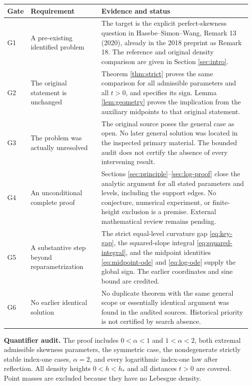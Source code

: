 \documentclass[11pt,a4paper]{article}
\theoremstyle{definition}
\theoremstyle{remark}
\numberwithin{equation}{section}
\newcommand{\hp}{h_\ast}
\begin{document}
\begingroup
\small
\renewcommand{\arraystretch}{1.15}
\begin{longtable}{@{}p{}>{\raggedright\arraybackslash}p{}>{\raggedright\arraybackslash}p{}@{}}
\toprule
Gate & Requirement & Evidence and status\\
\midrule
\endhead
G1 & A pre-existing identified problem &
The target is the explicit perfect-skewness question in
Hasebe--Simon--Wang, Remark 13 (2020), already in the 2018 preprint
as Remark 18. The reference and original density comparison are
given in Section \ref{sec:intro}.\\
G2 & The original statement is unchanged &
Theorem \ref{thm:strict} proves the same comparison for all admissible
parameters and all $t>0$, and specifies its sign. Lemma
\ref{lem:geometry} proves the implication from the auxiliary
midpoints to that original statement.\\
G3 & The problem was actually unresolved &
The original source poses the general case as open. No later general
solution was located in the inspected primary material. The bounded
audit does not certify the absence of every intervening result.\\
G4 & An unconditional complete proof &
Sections \ref{sec:principle}--\ref{sec:log-proof} close the analytic
argument for all stated parameters and levels, including the support
edges. No conjecture, numerical experiment, or finite-height
exclusion is a premise. External mathematical review remains pending.\\
G5 & A substantive step beyond reparametrization &
The strict equal-level curvature gap \eqref{eq:key-gap}, the
squared-slope integral \eqref{eq:squared-integral}, and the midpoint
identities \eqref{eq:midpoint-ode} and \eqref{eq:log-ode} supply the
global sign. The earlier coordinates and sine bound are credited.\\
G6 & No earlier identical solution &
No duplicate theorem with the same general scope or essentially
identical argument was found in the audited sources. Historical
priority is not certified by search absence.\\
\bottomrule
\end{longtable}
\endgroup

\noindent\textbf{Quantifier audit.}
The proof includes $0<\alpha<1$ and $1<\alpha<2$, both extremal
admissible skewness parameters, the symmetric case, the nondegenerate
strictly stable index-one cases, $\alpha=2$, and every logarithmic
index-one law after reflection. All density heights $0<h<\hp$ and
all distances $t>0$ are covered. Point masses are excluded because
they have no Lebesgue density.
\end{document}
